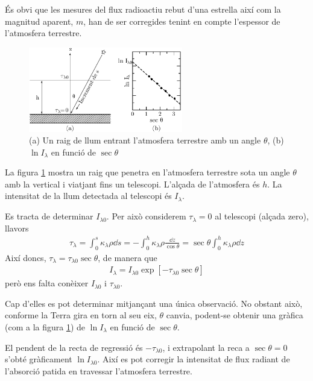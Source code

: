 \begin{example}
	És obvi que les mesures del flux radioactiu rebut d'una estrella així com la magnitud aparent, $m$, han de ser corregides tenint en compte l'espessor de l'atmosfera terrestre.
	\begin{figure}[h]
		\centering
		\includegraphics[width=0.6\textwidth]{./images/4-profunditat}
		\caption{(a) Un raig de llum entrant l'atmosfera terrestre amb un angle $\theta$, (b) $\ln I_{\lambda}$ en funció de $\sec \theta$}
		\label{fig:profunditat}
\end{figure}

	La figura \ref{fig:profunditat} mostra un raig que penetra en l'atmosfera terrestre sota un angle $\theta$ amb la vertical i viatjant fins un telescopi. L'alçada de l'atmosfera és $h$. La intensitat de la llum detectada al telescopi és $I_{\lambda}$.

	Es tracta de determinar $I_{\lambda 0}$. Per això considerem $\tau_{\lambda} = 0$ al telescopi (alçada zero), llavors
	\begin{align*}
		\tau_{\lambda} = \int_{0}^{s} \kappa_{\lambda} \rho \dd{s} = - \int_{0}^{h} \kappa_{\lambda} \rho \frac{\dd{z}}{\cos \theta} = \sec \theta \int_{0}^{h} \kappa_{\lambda} \rho \dd{z}
	\end{align*}
	Així doncs, $\tau_{\lambda} = \tau_{\lambda 0} \sec \theta$, de manera que
	\begin{align}
		I_{\lambda} = I_{\lambda 0} \exp[-\tau_{\lambda 0} \sec \theta]
	\end{align}
	però ens falta conèixer $I_{\lambda 0}$ i $\tau_{\lambda 0}$.

	Cap d'elles es pot determinar mitjançant una única observació. No obstant això, conforme la Terra gira en torn al seu eix, $\theta$ canvia, podent-se obtenir una gràfica (com a la figura \ref{fig:profunditat}) de $\ln I_{\lambda}$ en funció de $\sec \theta$.

	El pendent de la recta de regressió és $-\tau_{\lambda 0}$, i extrapolant la reca a $\sec \theta = 0$ s'obté gràficament $\ln I_{\lambda 0}$. Així es pot corregir la intensitat de flux radiant de l'absorció patida en travessar l'atmosfera terrestre.
\end{example}

